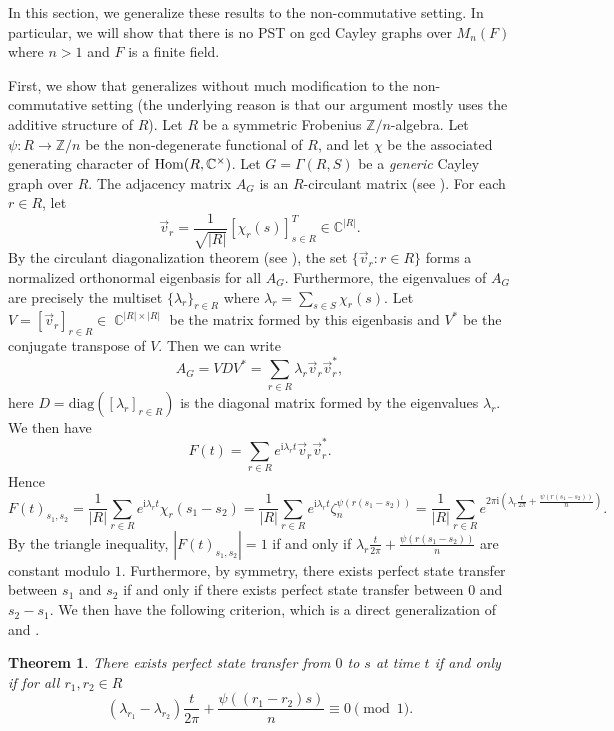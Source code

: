\documentclass[12pt, a4paper]{amsart}
\newtheorem{thm}{Theorem}[section]
\theoremstyle{definition}
\DeclareMathOperator{\C}{\mathbb{C}}
\DeclareMathOperator{\Hom}{{\rm Hom}}
\numberwithin{equation}{section}
\begin{document}
In this section, we generalize these results to the non-commutative setting. In particular, we will show that there is no PST on gcd Cayley graphs over $M_n(F)$ where $n > 1$ and $F$ is a finite field.




First, we show that \cite[Theorem 2.2]{nguyen_pst} generalizes without much modification to the non-commutative setting (the underlying reason is that our argument mostly uses the additive structure of $R$). Let $R$ be a symmetric Frobenius $\mathbb{Z}/n$-algebra. Let $\psi: R \to \mathbb{Z}/n$ be the non-degenerate functional of $R$, and let $\chi$ be the associated generating character of $\Hom(R, \mathbb{C}^{\times})$. Let $G = \Gamma(R,S)$ be a \textit{generic} Cayley graph over $R$. The adjacency matrix $A_G$ is an $R$-circulant matrix (see \cite{kanemitsu2013matrices, chebolu2022joins}). For each $r \in R$, let 
\[ \vec{v}_r = \frac{1}{\sqrt{|R|}}[\chi_r(s)]_{s \in R}^{T} \in \mathbb{C}^{|R|} .\] 
By the circulant diagonalization theorem (see \cite{kanemitsu2013matrices}), the set $\{\vec{v}_r : r \in R\}$ forms a normalized orthonormal eigenbasis for all $A_G$. Furthermore,  the eigenvalues of $A_G$ are precisely the multiset $\{\lambda_r \}_{r \in R}$ where $\lambda_r = \sum_{s \in S} \chi_r(s).$ 
Let $V = [\vec{v}_r]_{r \in R} \in \C^{|R| \times |R|}$ be the matrix formed by this eigenbasis and $V^{*}$ be the conjugate transpose of $V$. Then we can write
\[ A_G = V D V^*=\sum_{r \in R} \lambda_r \vec{v}_r\vec{v}_r^{*},\]
here $D =\text{diag}([\lambda_r]_{r \in R})$ is the diagonal matrix formed by the eigenvalues $\lambda_r.$ We then have
\[ F(t)= \sum_{r \in R} e^{\mathrm{i} \lambda_r t} \vec{v}_r \vec{v}_r^{*}. \]
Hence
\[ F(t)_{s_1, s_2} =  \frac{1}{|R|} \sum_{r \in R} e^{\mathrm{i} \lambda_r t} \chi_r(s_1-s_2)= \frac{1}{|R|} \sum_{r \in R} e^{\mathrm{i} \lambda_r t} \zeta_n^{\psi(r(s_1-s_2))} = \frac{1}{|R|} \sum_{r \in R} e^{2 \pi \mathrm{i} \left(\lambda_r \frac{t}{2 \pi}+\frac{ \psi(r(s_1-s_2))}{n}\right)}. \]
By the triangle inequality, $|F(t)_{s_1, s_2}|=1$ if and only if $\lambda_r \frac{t}{2 \pi} + \frac{\psi(r(s_1-s_2))}{n}$ are constant modulo $1.$ Furthermore, by symmetry, there exists perfect state transfer between $s_1$ and $s_2$ if and only if there exists perfect state transfer between $0$ and $s_2-s_1.$ We then have the following criterion, which is a direct generalization of \cite[Theorem 4]{bavsic2009perfect} and \cite[Theorem 2.2]{nguyen_pst}.
\begin{thm} \label{thm:condition-pst}
    There exists perfect state transfer from $0$ to $s$ at time $t$ if and only if for all $r_1, r_2 \in R$
    \[ (\lambda_{r_1}-\lambda_{r_2}) \frac{t}{2 \pi} + \frac{\psi((r_1-r_2)s)}{n} \equiv 0 \pmod{1}.\]
\end{thm}
\end{document}
